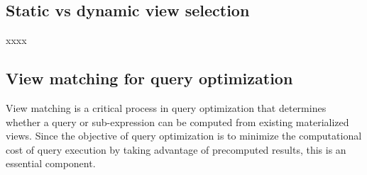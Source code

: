 \subsection{ Static vs dynamic view selection } xxxx

\subsection{View matching for query optimization }

View matching is a critical process in query optimization that determines whether a query or sub-expression can be computed from existing materialized views. Since the objective of query optimization is to minimize the computational cost of query execution by taking advantage of precomputed results, this is an essential component.\vspace{.4cm}

